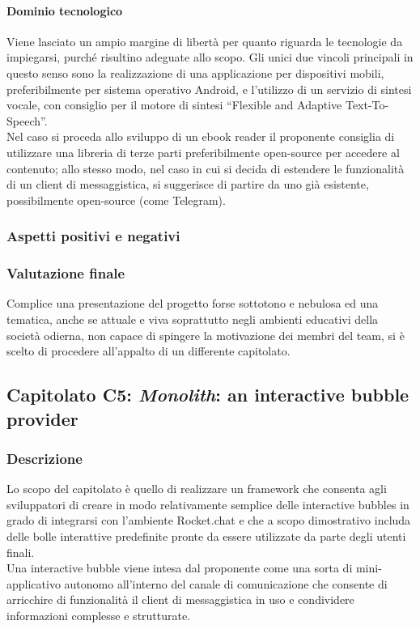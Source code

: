 			\paragraph{Dominio tecnologico}
			Viene lasciato un ampio margine di libertà per quanto riguarda le tecnologie da impiegarsi, purché risultino adeguate allo scopo. 
			Gli unici due vincoli principali in questo senso sono la realizzazione di una applicazione per dispositivi mobili, preferibilmente per 
			sistema operativo Android, e l'utilizzo di un servizio di sintesi vocale, con consiglio per il motore di sintesi “Flexible and Adaptive 
			Text-To-Speech”.
			\\Nel caso si proceda allo sviluppo di un ebook reader il proponente consiglia di utilizzare una libreria di terze parti preferibilmente 
			open-source per accedere al contenuto; allo stesso modo, nel caso in cui si decida di estendere le funzionalità di un client di messaggistica, 
			si suggerisce di partire da uno già esistente, possibilmente open-source (come Telegram).
		\subsubsection{Aspetti positivi e negativi}
		\subsubsection{Valutazione finale}
		Complice una presentazione del progetto forse sottotono e nebulosa ed una tematica, anche se attuale e viva soprattutto negli ambienti 
		educativi della società odierna, non capace di spingere la motivazione dei membri del team, si è scelto di procedere all'appalto di un 
		differente capitolato.
		
	\subsection{Capitolato C5: \emph{Monolith}: an interactive bubble provider}
		\subsubsection{Descrizione}
		Lo scopo del capitolato è quello di realizzare un framework che consenta agli sviluppatori di creare in modo relativamente semplice delle 
		interactive bubbles in grado di integrarsi con l'ambiente Rocket.chat e che a scopo dimostrativo includa delle bolle interattive predefinite 
		pronte da essere utilizzate da parte degli utenti finali.
		\\Una interactive bubble viene intesa dal proponente come una sorta di mini-applicativo autonomo all'interno del canale di comunicazione 
		che consente di arricchire di funzionalità il client di messaggistica in uso e condividere informazioni complesse e strutturate.

